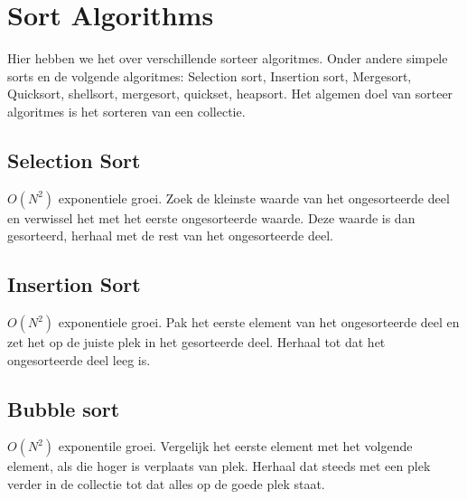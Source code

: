 \section{Sort Algorithms}
Hier hebben we het over verschillende sorteer algoritmes.
Onder andere simpele sorts en de volgende algoritmes: Selection sort, Insertion sort, Mergesort, Quicksort, shellsort, mergesort, quickset, heapsort.
Het algemen doel van sorteer algoritmes is het sorteren van een collectie.

\subsection{Selection Sort}
$O(N^2)$ exponentiele groei.
Zoek de kleinste waarde van het ongesorteerde deel en verwissel het met het eerste ongesorteerde waarde.
Deze waarde is dan gesorteerd, herhaal met de rest van het ongesorteerde deel.

\subsection{Insertion Sort}
$O(N^2)$ exponentiele groei.
Pak het eerste element van het ongesorteerde deel en zet het op de juiste plek in het gesorteerde deel.
Herhaal tot dat het ongesorteerde deel leeg is.

\subsection{Bubble sort}
$O(N^2)$ exponentile groei.
Vergelijk het eerste element met het volgende element, als die hoger is verplaats van plek.
Herhaal dat steeds met een plek verder in de collectie tot dat alles op de goede plek staat.
